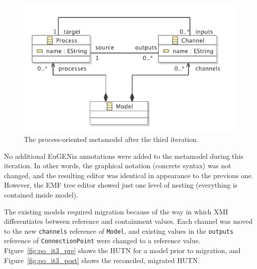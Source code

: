 \begin{figure}[htbp]
	\centering
		\includegraphics[scale=0.75]{A.2.ProcessOriented/images/3_mm.pdf}
	\caption{The process-oriented metamodel after the third iteration.}
	\label{fig:po_it3_mm}
\end{figure}

No additional EuGENia annotations were added to the metamodel during this iteration. In other words, the graphical notation (concrete syntax) was not changed, and the resulting editor was identical in appearance to the previous one. However, the EMF tree editor showed just one level of nesting (everything is contained inside model).

The existing models required migration because of the way in which XMI differentiates between reference and containment values. Each channel was moved to the new \texttt{ch\-an\-ne\-ls} reference of \texttt{Mo\-d\-el}, and existing values in the \texttt{ou\-tp\-u\-ts} reference of \texttt{Co\-nn\-ec\-ti\-onPo\-in\-t} were changed to a reference value. Figure~\ref{fig:po_it3_pre} shows the HUTN for a model prior to migration, and Figure~\ref{fig:po_it3_post} shows the reconciled, migrated HUTN.

